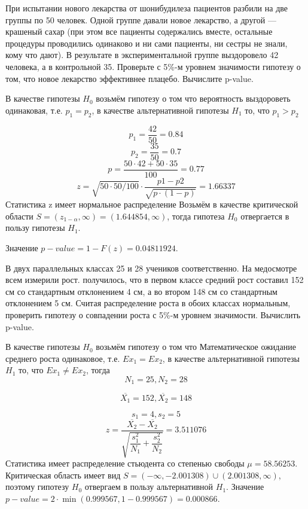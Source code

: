 \begin{problem}
	При испытании нового лекарства от шонибудилеза пациентов разбили на
	две группы по 50 человек. Одной группе давали новое лекарство, а другой — крашеный
	сахар (при этом все пациенты содержались вместе, остальные процедуры проводились
	одинаково и ни сами пациенты, ни сестры не знали, кому что дают). В результате в
	экспериментальной группе выздоровело 42 человека, а в контрольной 35. Проверьте с
	5\%-м уровнем значимости гипотезу о том, что новое лекарство эффективнее плацебо.
	Вычислите p-value.
\end{problem}
	В качестве гипотезы $H_0$ возьмём гипотезу о том что вероятность выздороветь одинаковая, т.е. $p_1 = p_2$, в качестве альтернативной гипотезы $H_1$ то, что $p_1>p_2$
	
	\[ p_1 = \frac{42}{50} = 0.84\]
	\[ p_2 = \frac{35}{50} = 0.7\]
	\[ p = \frac{50 \cdot 42 + 50\cdot 35}{100 } = 0.77 \]
	\[ z = \sqrt{50\cdot50/100}\cdot \dfrac{p1-p2}{\sqrt{p\cdot(1-p)}} = 1.66337
	 \]
	 Статистика z имеет нормальное распределение 
	 Возьмём в качестве критической области $S = (z_{1-\alpha}, \infty) = (1.644854, \infty)$, тогда гипотеза $H_0$ отвергается в пользу гипотезы $H_1$.
	 
	 Значение $p-value = 1 - F(z) = 0.04811924$.
	 
\begin{problem}
	В двух параллельных классах 25 и 28 учеников соответственно. На медосмотре всем измерили рост. получилось, что в первом классе средний рост составил
	152 см со стандартным отклонением 4 см, а во втором 148 см со стандартным отклонением 5 см. Считая распределение роста в обоих классах нормальным, проверить гипотезу
	о совпадении роста с 5\%-м уровнем значимости. Вычислить p-value.
\end{problem}
		В качестве гипотезы $H_0$ возьмём гипотезу о том что Математическое ожидание среднего роста одинаковое, т.е. $Ex_1 = Ex_2$, в качестве альтернативной гипотезы $H_1$ то, что $Ex_1 \ne Ex_2$, тогда 
		\[ N_1 = 25, N_2 = 28 \]
		
		\[ \overline{X_1} = 152,\overline{X_2} = 148 \]
		
		 \[ s_1 = 4, s_2 = 5 \]
		 \[ z =  \dfrac{\overline{X_2} - \overline{X_2}}{\sqrt{\dfrac{s_1^2}{N_1}+\dfrac{s_2^2}{N_2}}} = 3.511076\]
		 Статистика имеет распределение стьюдента со степенью свободы $\mu = 58.56253$.
		 Критическая область имеет вид $S = (-\infty, -2.001308) \cup(2.001308, \infty)$, поэтому гипотезу $H_0$ отвергаем в пользу альтернативной $H_1$.
		 Значение $p-value = 2 \cdot \min(0.999567,1 - 0.999567) = 0.000866$.
		 
		 
	 
